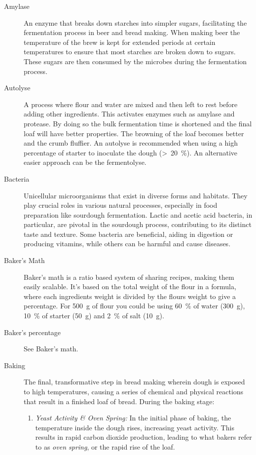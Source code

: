 \begin{description}
\item[Amylase] An enzyme that breaks down starches into simpler sugars, facilitating
the fermentation process in beer and bread making. When making beer the temperature
of the brew is kept for extended periods at certain temperatures to ensure that most
starches are broken down to sugars. These sugars are then consumed by the microbes
during the fermentation process.

\item[Autolyse] A process where flour and water are mixed and then left to rest
before adding other ingredients. This activates enzymes such as amylase and protease.
By doing so the bulk fermentation time is shortened and the final loaf will have
better properties. The browning of the loaf becomes better and the crumb fluffier.
An autolyse is recommended when using a high percentage of starter to inoculate the
dough (>~\SI{20}{\percent}). An alternative easier approach can be the fermentolyse.

\item[Bacteria] Unicellular microorganisms that exist in diverse forms and
habitats. They play crucial roles in various natural processes, especially in food
preparation like sourdough fermentation. Lactic and acetic acid bacteria, in particular,
are pivotal in the sourdough process, contributing to its distinct taste and texture.
Some bacteria are beneficial, aiding in digestion or producing vitamins, while others
can be harmful and cause diseases.

\item[Baker’s Math] Baker’s math is a ratio based system of sharing recipes,
making them easily scalable. It’s based on the total weight of the flour in a formula,
where each ingredients weight is divided by the flours weight to give a percentage.
For \SI{500}{\gram} of flour you could be using \SI{60}{\percent} of water (\SI{300}{\gram}),
\SI{10}{\percent} of starter (\SI{50}{\gram}) and \SI{2}{\percent} of salt (\SI{10}{\gram}).

\item[Baker’s percentage] See Baker’s math.

\item[Baking] The final, transformative step in bread making wherein dough is
exposed to high temperatures, causing a series of chemical and physical reactions
that result in a finished loaf of bread. During the baking stage:

\begin{enumerate}
\item \emph{Yeast Activity \& Oven Spring:} In the initial phase of baking, the
temperature inside the dough rises, increasing yeast activity. This results in rapid
carbon dioxide production, leading to what bakers refer to as \emph{oven spring}, or the
rapid rise of the loaf.


\end{enumerate}
\end{description}
